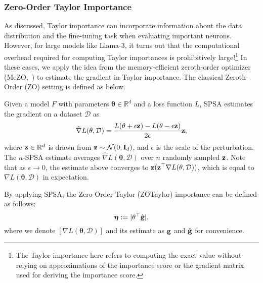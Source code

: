 \subsubsection{Zero-Order Taylor Importance} \label{subsubsec:ZOTaylor}
As discussed, Taylor importance can incorporate information about the data distribution and the fine-tuning task when evaluating important neurons. However, for large models like Llama-3, it turns out that the computational overhead required for computing Taylor importances is prohibitively large!\footnote{The Taylor importance here refers to computing the exact value without relying on approximations of the importance score or the gradient matrix used for deriving the importance score.} In these cases, we apply the idea from the memory-efficient zeroth-order optimizer (MeZO,~\citealt{malladi2023fine}) to estimate the gradient in Taylor importance. %
The classical Zeroth-Order (ZO) setting is defined as below. 

\begin{definition}
Given a model \(F\) with parameters $\mathbf{\theta}\in \mathbb{R}^{d}$ and a loss function $L$, SPSA estimates the gradient on a dataset $\mathcal{D}$ as 
\[\hat{\nabla} L(\mathbf{\theta}, \mathcal{D}) = \frac{L(\mathbf{\theta} + \epsilon{\mathbf{z}}) - L(\mathbf{\theta} - \epsilon{\mathbf{z}})}{2\epsilon}{\mathbf{z}}, \]
where ${\mathbf{z}}\in\mathbb{R}^{d}$ is drawn from ${\mathbf{z}}\sim \mathcal{N}(0, \mathbf{I}_d)$, and $\epsilon$ is the scale of the perturbation.  %
The $n$-SPSA estimate averages $\hat{\nabla} L(\mathbf{\theta}, \mathcal{D})$ over $n$ randomly sampled ${\mathbf{z}}$. Note that as $\epsilon \rightarrow 0$, the estimate above converges to ${\mathbf{z}} ({\mathbf{z}}^\top \nabla L(\mathbf{\theta}, \mathcal{D}))$, which is equal to $\nabla L(\mathbf{\theta}, \mathcal{D})$ in expectation.
\end{definition}
By applying SPSA, the Zero-Order Taylor (ZOTaylor) importance can be defined as follows: 
\begin{equation}
    {\bm \eta} := |\mathbf{\theta}^\top \hat{{\mathbf{g}}}|.\label{eq:qmtaylor_label}
\end{equation}
where we denote $[\nabla L(\mathbf{\theta}, \mathcal{D})]$ and its estimate as ${\mathbf{g}}$ and $\hat{{\mathbf{g}}}$ for convenience.

